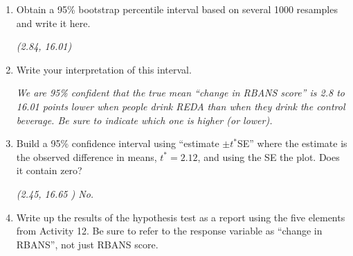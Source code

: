 \begin{enumerate}
\begin{key}
  {\it  I got 1.09 for Control, -7.97 for REDA with difference = -9.06.  }
\end{key}
    \item Obtain a 95\% bootstrap percentile interval based on several
      1000 resamples and write it here.
\begin{students}
    \vspace{2cm}    
\end{students}

\begin{key}
  {\it (2.84, 16.01)  }
\end{key}
    \item Write your interpretation of this interval.
\begin{students}
    \vspace{4cm}    
\end{students}

\begin{key}
  {\it  We are 95\% confident that the true mean ``change in RBANS score''
  is  2.8 to 16.01 points lower when people drink REDA than when they
   drink the control beverage. Be sure to indicate which one is higher
 (or lower). } 
\end{key}
\item Build a 95\% confidence interval using ``estimate $\pm t^*$SE'' where the
  estimate is the observed difference in means, $t^* = 2.12$, and
  using the SE the plot.  Does it contain zero?
 \begin{students}
    \vspace{2cm}    
\end{students}

\begin{key}
  {\it (2.45, 16.65 )  No.}
\end{key}


\item Write up the results of the hypothesis test as a report using
  the five elements from Activity 12.  Be sure to refer to the response
  variable as ``change in RBANS'', not just RBANS score. \\ 

\begin{students}
 \newpage 
\end{students}


\end{enumerate}
